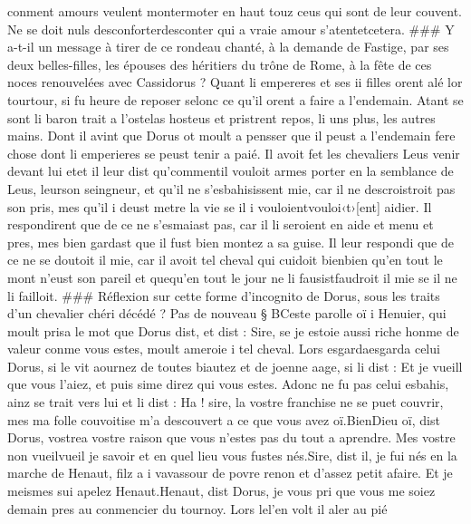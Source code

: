 \documentclass{article}
\begin{document}
\begin{pages}
      conment amours veulent montermoter en haut touz ceus 
      qui sont de leur couvent.
      Ne se doit nuls desconforterdesconter 
      qui a vraie amour s’atentetcetera.
   ### Y a-t-il un message à tirer de ce rondeau chanté, à la demande de Fastige, par ses deux belles-filles,
      les épouses des héritiers du trône de Rome, à la fête de ces noces renouvelées avec Cassidorus ? \pend
\pstart Quant li empereres et ses ii filles
   orent alé lor tourtour, si fu heure de reposer selonc ce qu’il orent a faire
   a l’endemain. Atant se sont li baron trait a l’ostelas hosteus 
   et pristrent repos, li uns plus, les autres mains. Dont il avint que Dorus ot
   moult a pensser que il peust a l’endemain fere chose dont li emperieres
   se peust tenir a paié. Il avoit fet les chevaliers Leus venir devant lui 
   etet il leur dist 
   qu’commentil vouloit armes porter 
      en la semblance de Leus, leurson seingneur,
      et qu’il ne s’esbahisissent mie, car il ne descroistroit pas son pris,
      mes qu’il i deust metre la vie se il i vouloientvouloi‹t›[ent] aidier.
   Il respondirent que de ce ne s’esmaiast pas, car il li seroient 
      en aide et menu et pres, 
      mes bien gardast que il fust bien montez a sa guise.
   Il leur respondi que de ce ne se doutoit il mie, car il avoit tel cheval qui cuidoit 
      bienbien qu'en tout le mont n'eust son pareil et 
      quequ'en tout le jour ne li 
      fausistfaudroit il mie se il ne li failloit.
   ### Réflexion sur cette forme d'incognito de Dorus, sous les traits d'un chevalier chéri décédé ? \pend
\pstart Pas de nouveau § BCeste parolle oï i 
   Henuier,
   qui moult prisa le mot que Dorus dist, et dist :
   Sire, se je estoie aussi riche honme de valeur conme vous estes,
      moult ameroie i tel cheval.
   Lors esgardaesgarda celui Dorus, 
   si le vit aournez de toutes biautez et de joenne aage, si li dist :
   Et je vueill que vous l’aiez, 
      et puis sime direz qui vous estes.
   Adonc ne fu pas celui esbahis, ainz se trait vers lui et li dist :
   Ha ! sire, la vostre franchise ne se puet couvrir,
      mes ma folle couvoitise m’a descouvert a ce que vous avez oï.BienDieu oï, 
      dist Dorus, 
      vostrea vostre raison que vous n’estes pas du tout a aprendre. 
      Mes vostre non vueilvueil je savoir et en quel lieu vous fustes nés.Sire, dist il, je fui nés en la marche de Henaut, filz a i 
      vavassour de povre renon et d’assez petit afaire. Et je meismes sui apelez Henaut.Henaut, dist Dorus,
      je vous pri que vous me soiez demain pres au conmencier du tournoy.
   Lors lel'en volt il aler au pié 

\end{pages}
\end{document}
